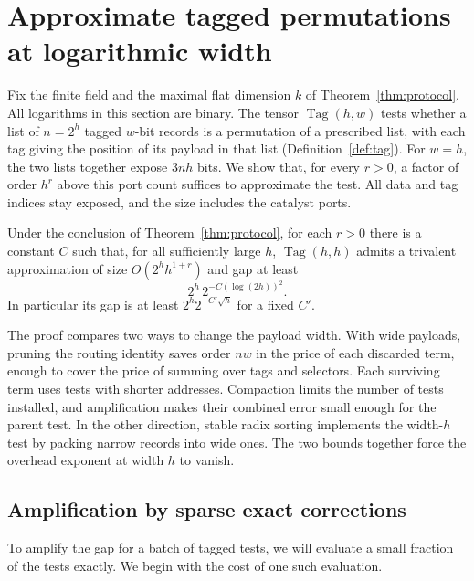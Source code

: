 \section{Approximate tagged permutations at logarithmic width}\label{sec:width}

Fix the finite field and the maximal flat dimension $k$ of
Theorem~\ref{thm:protocol}. All logarithms in this section are binary.
The tensor $\operatorname{Tag}(h,w)$ tests whether a list of $n=2^h$
tagged $w$-bit records is a permutation of a prescribed list, with each
tag giving the position of its payload in that list
(Definition~\ref{def:tag}). For $w=h$, the two lists together expose
$3nh$ bits. We show that, for every $r>0$, a factor of order $h^r$
above this port count suffices to approximate the test. All data and
tag indices stay exposed, and the size includes the catalyst ports.

\par{}
\begin{theorem}\label{thm:cheaptag}
Under the conclusion of Theorem~\ref{thm:protocol},
for each $r>0$ there is a constant $C$ such that, for all sufficiently
large $h$, $\operatorname{Tag}(h,h)$ admits a trivalent approximation
of size $O(2^h h^{1+r})$ and gap at least
\[
               2^h\,2^{-C(\log(2h))^2}.
\]
In particular its gap is at least $2^h2^{-C'\sqrt h}$ for a fixed $C'$.
\end{theorem}

The proof compares two ways to change the payload width. With wide
payloads, pruning the routing identity saves order $nw$ in the price of
each discarded term, enough to cover the price of summing over tags and
selectors. Each surviving term uses tests with shorter addresses.
Compaction limits the number of tests installed, and amplification
makes their combined error small enough for the parent test. In the
other direction, stable radix sorting implements the width-$h$ test by
packing narrow records into wide ones. The two bounds together force
the overhead exponent at width $h$ to vanish.



\subsection{Amplification by sparse exact corrections}

To amplify the gap for a batch of tagged tests, we will evaluate a
small fraction of the tests exactly. We begin with the cost of one such
evaluation.

